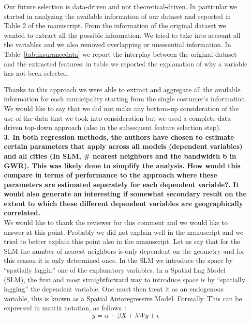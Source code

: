 \documentclass[12pt]{article}
\begin{document}
Our future selection is data-driven and not theoretical-driven. In particular we started in analyzing the available information of our dataset and reported in Table 2 of the manuscript. From the information of the original dataset we wanted to extract all the possible information. We tried to take into account all the variables and we also removed overlapping or unessential information. In Table~\ref{tab:insurancedata} we report the interplay between the original dataset and the extracted features: in table we reported the explanation of why a variable has not been selected. 



Thanks to this approach we were able to extract and aggregate all the available information for each municipality starting from the single costumer's information. We would like to say that we did not make any bottom-up consideration of the use of the data that we took into consideration but we used a complete data-driven top-down approach (also in the subsequent feature selection step).
\\

\textbf{3. In both regression methods, the authors have chosen to estimate certain parameters that apply across all models (dependent variables) and all cities (In SLM, \# nearest neighbors and the bandwidth b in GWR). This was likely done to simplify the analysis. How would this compare in terms of performance to the approach where these parameters are estimated separately for each dependent variable?. It would also generate an interesting if somewhat secondary result on the extent to which these different dependent variables are geographically correlated.}
\\

We would like to thank the reviewer for this comment and we would like to answer at this point. Probably we did not explain well in the manuscript and we tried to better explain this point also in the manuscript. Let us say that for the SLM the number of nearest neighbors is only dependent on the geometry and for this reason it is only determined once. In the SLM we introduce the space  by ``spatially laggin'' one of the explanatory variables. In a Spatial Lag Model (SLM), the first and most straightforward way to introduce space is by ``spatially lagging'' the dependent variable. One must then treat it as an endogenous variable, this is known as a Spatial Autoregressive Model. Formally. This can be expressed in matrix notation, as follows~\cite{anselin2001spatial}:
 \begin{equation}
 y = \alpha + \beta X+\lambda W y + \epsilon
 \end{equation}
\end{document}
